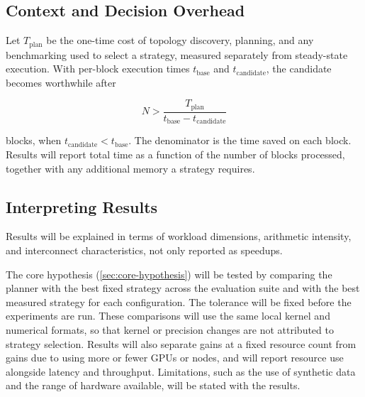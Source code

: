 \subsection{Context and Decision Overhead}
\label{sec:context-and-decision-overhead}

Let $T_{\mathrm{plan}}$ be the one-time cost of topology discovery, planning, and any benchmarking used to select a strategy, measured separately from steady-state execution. With per-block execution times $t_{\mathrm{base}}$ and $t_{\mathrm{candidate}}$, the candidate becomes worthwhile after

\[
  N > \frac{T_{\mathrm{plan}}}{t_{\mathrm{base}} - t_{\mathrm{candidate}}}
\]

blocks, when $t_{\mathrm{candidate}} < t_{\mathrm{base}}$. The denominator is the time saved on each block. Results will report total time as a function of the number of blocks processed, together with any additional memory a strategy requires.

\subsection{Interpreting Results}
\label{sec:interpreting-results}

Results will be explained in terms of workload dimensions, arithmetic intensity, and interconnect characteristics, not only reported as speedups.

The core hypothesis (\cref{sec:core-hypothesis}) will be tested by comparing the planner with the best fixed strategy across the evaluation suite and with the best measured strategy for each configuration. The tolerance will be fixed before the experiments are run. These comparisons will use the same local kernel and numerical formats, so that kernel or precision changes are not attributed to strategy selection. Results will also separate gains at a fixed resource count from gains due to using more or fewer GPUs or nodes, and will report resource use alongside latency and throughput. Limitations, such as the use of synthetic data and the range of hardware available, will be stated with the results.
